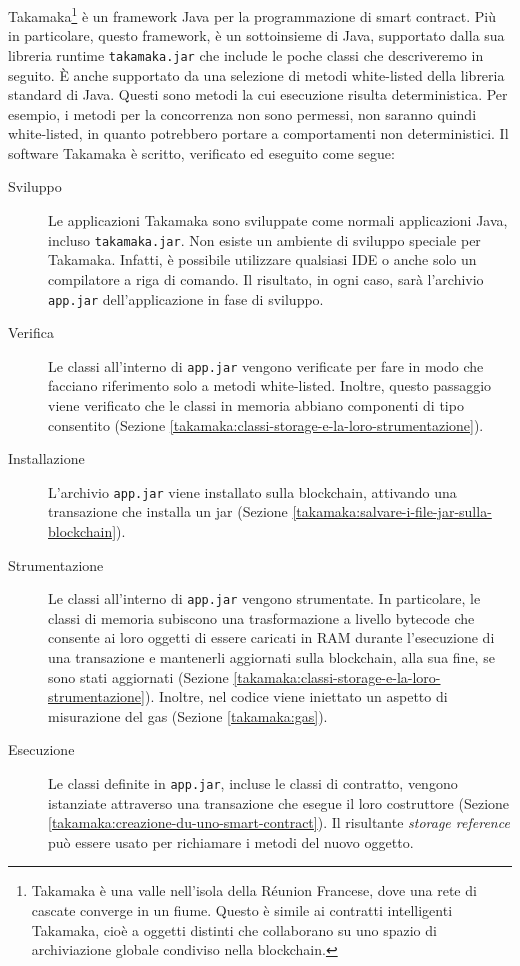 Takamaka\footnote{Takamaka è una valle nell'isola della Réunion Francese, dove una rete di cascate converge in un fiume. Questo è simile ai contratti intelligenti Takamaka, cioè a oggetti distinti che collaborano su uno spazio di archiviazione globale condiviso nella blockchain.} è un framework Java per la programmazione di smart contract. Più in particolare, questo framework, è un sottoinsieme di Java, supportato dalla sua libreria runtime \lstinline|takamaka.jar| che include le poche classi che descriveremo in seguito. È anche supportato da una selezione di metodi white-listed della libreria standard di Java. Questi sono metodi la cui esecuzione risulta deterministica. Per esempio, i metodi per la concorrenza non sono permessi, non saranno quindi white-listed, in quanto potrebbero portare a comportamenti non deterministici. Il software Takamaka è scritto, verificato ed eseguito come segue:
\begin{description}
	\item[Sviluppo] 
		Le applicazioni Takamaka sono sviluppate come normali applicazioni Java, incluso \lstinline|takamaka.jar|. Non esiste un ambiente di sviluppo speciale per Takamaka. Infatti, è possibile utilizzare qualsiasi IDE o anche solo un compilatore a riga di comando. Il risultato, in ogni caso, sarà l'archivio \lstinline|app.jar| dell'applicazione in fase di sviluppo.
	\item[Verifica] 
		Le classi all'interno di \lstinline|app.jar| vengono verificate per fare in modo che facciano riferimento solo a metodi white-listed. Inoltre, questo passaggio viene verificato che le classi in memoria abbiano componenti di tipo consentito (Sezione \ref{takamaka:classi-storage-e-la-loro-strumentazione}).
	\item[Installazione]
		L'archivio \lstinline|app.jar| viene installato sulla blockchain, attivando una transazione che installa un jar (Sezione \ref{takamaka:salvare-i-file-jar-sulla-blockchain}).
	\item[Strumentazione]
		Le classi all'interno di \lstinline|app.jar| vengono strumentate. In particolare, le classi di memoria subiscono una trasformazione a livello bytecode che consente ai loro oggetti di essere caricati in RAM durante l'esecuzione di una transazione e mantenerli aggiornati sulla blockchain, alla sua fine, se sono stati aggiornati (Sezione \ref{takamaka:classi-storage-e-la-loro-strumentazione}). Inoltre, nel codice viene iniettato un aspetto di misurazione del gas (Sezione \ref{takamaka:gas}).
	\item[Esecuzione] 
		Le classi definite in \lstinline|app.jar|, incluse le classi di contratto, vengono istanziate attraverso una transazione che esegue il loro costruttore (Sezione \ref{takamaka:creazione-du-uno-smart-contract}). Il risultante \textit{storage reference} può essere usato per richiamare i metodi del nuovo oggetto.
\end{description}
